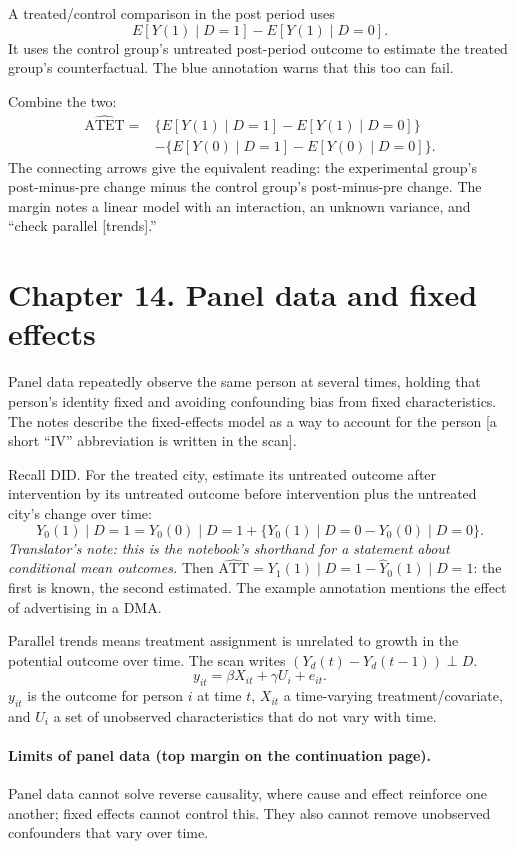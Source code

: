 A treated/control comparison in the post period uses
\[E[Y(1)\mid D=1]-E[Y(1)\mid D=0].\]
It uses the control group's untreated post-period outcome to estimate the treated group's counterfactual. The blue annotation warns that this too can fail.

Combine the two:
\begin{align*}
\widehat{\mathrm{ATET}}={}&\{E[Y(1)\mid D=1]-E[Y(1)\mid D=0]\}\\
&-\{E[Y(0)\mid D=1]-E[Y(0)\mid D=0]\}.
\end{align*}
The connecting arrows give the equivalent reading: the experimental group's post-minus-pre change minus the control group's post-minus-pre change. The margin notes a linear model with an interaction, an unknown variance, and ``check parallel [trends].''

\section{Chapter 14. Panel data and fixed effects}
Panel data repeatedly observe the same person at several times, holding that person's identity fixed and avoiding confounding bias from fixed characteristics. The notes describe the fixed-effects model as a way to account for the person [a short ``IV'' abbreviation is written in the scan].

Recall DID. For the treated city, estimate its untreated outcome after intervention by its untreated outcome before intervention plus the untreated city's change over time:
\[Y_0(1)\mid D=1
=Y_0(0)\mid D=1+\{Y_0(1)\mid D=0-Y_0(0)\mid D=0\}.
\]
\textit{Translator's note: this is the notebook's shorthand for a statement about conditional mean outcomes.}
Then $\widehat{\mathrm{ATT}}=Y_1(1)\mid D=1-\widehat Y_0(1)\mid D=1$: the first is known, the second estimated. The example annotation mentions the effect of advertising in a DMA.

Parallel trends means treatment assignment is unrelated to growth in the potential outcome over time. The scan writes $(Y_d(t)-Y_d(t-1))\perp D$.
\[y_{it}=\beta X_{it}+\gamma U_i+e_{it}.\]
$y_{it}$ is the outcome for person $i$ at time $t$, $X_{it}$ a time-varying treatment/covariate, and $U_i$ a set of unobserved characteristics that do not vary with time.

\paragraph{Limits of panel data (top margin on the continuation page).}
Panel data cannot solve reverse causality, where cause and effect reinforce one another; fixed effects cannot control this. They also cannot remove unobserved confounders that vary over time.

